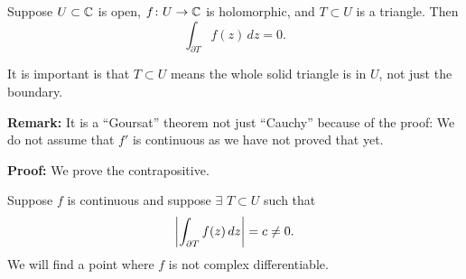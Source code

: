 \documentclass[10pt,aspectratio=169]{beamer}
\begin{document}
\begin{frame}
\begin{theorem}
Suppose $U \subset {\mathbb{C}}$ is open, $f \colon U \to {\mathbb{C}}$ is
holomorphic,
and $T \subset U$ is a triangle.  Then
\[
\int_{\partial T} f(z) \, dz = 0 .
\]
\end{theorem}

\pause

It is important is that $T \subset U$ means the whole solid triangle
is in $U$, not just the boundary.

\pause
\medskip

\textbf{Remark:} It is a ``Goursat'' theorem not just ``Cauchy''
because of the proof: We do not assume that
$f'$ is continuous as we have not proved that yet.

\pause
\medskip

\textbf{Proof:}
We prove the contrapositive.

\medskip
\pause

Suppose $f$ is continuous and suppose $\exists$ $T \subset U$ such that
\[
\left\lvert {\int_{\partial T} f(z) \, dz} \right\rvert = c \not= 0 .
\]
\pause
We will find a point where $f$ is not complex differentiable.
\end{frame}
\end{document}
